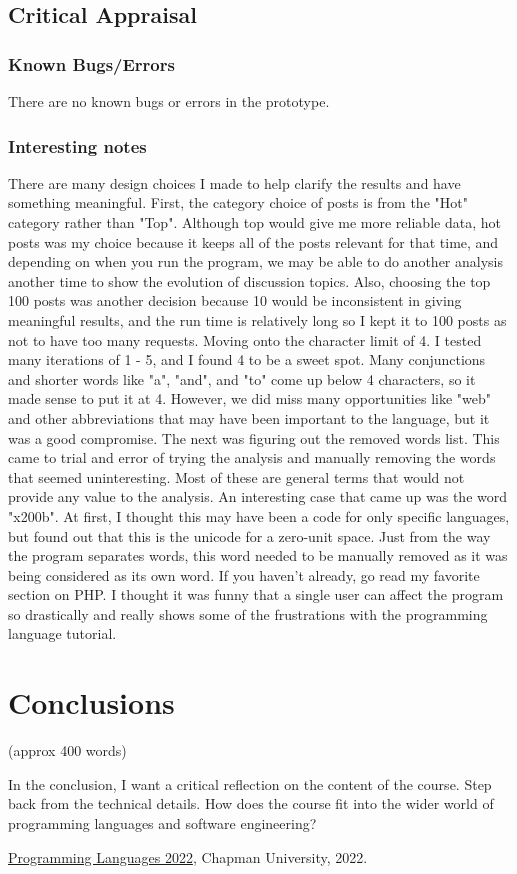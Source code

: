\documentclass{article}
\theoremstyle{theorem}
\theoremstyle{definition}
\theoremstyle{remark}
\begin{document}
\subsection{Critical Appraisal}
\subsubsection{Known Bugs/Errors}
There are no known bugs or errors in the prototype.

\subsubsection{Interesting notes}
There are many design choices I made to help clarify the results and have something meaningful. First, the category choice of posts is from the "Hot" category rather than "Top". Although top would give me more reliable data, hot posts was my choice because it keeps all of the posts relevant for that time, and depending on when you run the program, we may be able to do another analysis another time to show the evolution of discussion topics. Also, choosing the top 100 posts was another decision because 10 would be inconsistent in giving meaningful results, and the run time is relatively long so I kept it to 100 posts as not to have too many requests. Moving onto the character limit of 4. I tested many iterations of 1 - 5, and I found 4 to be a sweet spot. Many conjunctions and shorter words like "a", "and", and "to" come up below 4 characters, so it made sense to put it at 4. However, we did miss many opportunities like "web" and other abbreviations that may have been important to the language, but it was a good compromise. The next was figuring out the removed words list. This came to trial and error of trying the analysis and manually removing the words that seemed uninteresting. Most of these are general terms that would not provide any value to the analysis. An interesting case that came up was the word "x200b". At first, I thought this may have been a code for only specific languages, but found out that this is the unicode for a zero-unit space. Just from the way the program separates words, this word needed to be manually removed as it was being considered as its own word. If you haven't already, go read my favorite section on PHP. I thought it was funny that a single user can affect the program so drastically and really shows some of the frustrations with the programming language tutorial. 

\section{Conclusions}\label{conclusions}

(approx 400 words)

In the conclusion, I want a critical reflection on the content of the course. Step back from the technical details. How does the course fit into the wider world of programming languages and software engineering?

\begin{thebibliography}{99}
 \href{https://github.com/alexhkurz/programming-languages-2022/blob/main/README.md}{Programming Languages 2022}, Chapman University, 2022.
\end{thebibliography}
\end{document}
